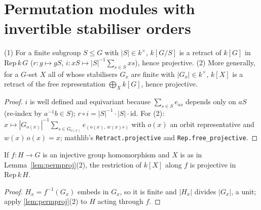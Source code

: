\section{Permutation modules with invertible stabiliser orders}

\begin{lemma}\label{lem:permproj}
  \leanok
  (1) For a finite subgroup $S\le G$ with $|S|\in k^\times$, $k[G/S]$ is a retract of $k[G]$ in $\mathrm{Rep}\,k\,G$
  ($r:g\mapsto gS$, $i:xS\mapsto|S|^{-1}\sum_{s\in S}xs$), hence projective. (2) More generally, for a $G$-set $X$ all of
  whose stabilisers $G_x$ are finite with $|G_x|\in k^\times$, $k[X]$ is a retract of the free representation
  $\bigoplus_X k[G]$, hence projective.
\end{lemma}
\begin{proof}
  \leanok
  $i$ is well defined and equivariant because $\sum_{s\in S}e_{as}$ depends only on $aS$ (re-index by $a^{-1}b\in S$);
  $r\circ i=|S|^{-1}\cdot|S|\cdot\mathrm{id}$. For (2): $x\mapsto|G_{o(x)}|^{-1}\sum_{s\in G_{o(x)}}e_{(o(x),\,w(x)s)}$ with
  $o(x)$ an orbit representative and $w(x)\,o(x)=x$; mathlib's \texttt{Retract.projective} and \texttt{Rep.free\_projective}.
\end{proof}

\begin{lemma}\label{lem:permproj-res}
  \leanok
  If $f:H\to G$ is an injective group homomorphism and $X$ is as in Lemma~\ref{lem:permproj}(2), the restriction of
  $k[X]$ along $f$ is projective in $\mathrm{Rep}\,k\,H$.
\end{lemma}
\begin{proof}
  \leanok
  $H_x=f^{-1}(G_x)$ embeds in $G_x$, so it is finite and $|H_x|$ divides $|G_x|$, a unit; apply \ref{lem:permproj}(2) to
  $H$ acting through $f$.
\end{proof}

